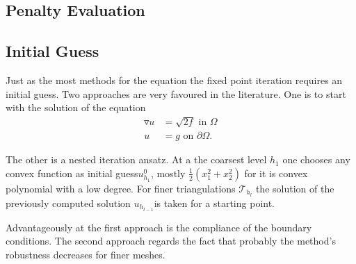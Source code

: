 \subsection{Penalty Evaluation}

\subsection{Initial Guess}
Just as the most methods for the \MA equation the fixed point iteration requires an initial guess. Two approaches are very favoured in the literature.
One is to start with the solution of the equation
\begin{align}
	\triangledown u &= \sqrt{2f} \text{ in } \Omega \\
	u &= g \text{ on }\partial \Omega.
\end{align}

The other is a nested iteration ansatz. At a the coarsest level $h_1$ one chooses any convex function as initial guess$u^0_{h_1}$, mostly $\frac 1 2 ({x_1^2} + {x_2^2}) $ for it is convex polynomial with a low degree. For finer triangulations $\mathcal{T}_{h_{l}}$ the solution of the previously computed solution $u_{h_{l-1}}$is taken for a starting point.

Advantageously at the first approach is the compliance of the boundary conditions.
The second approach regards the fact that probably the method's robustness decreases for finer meshes.